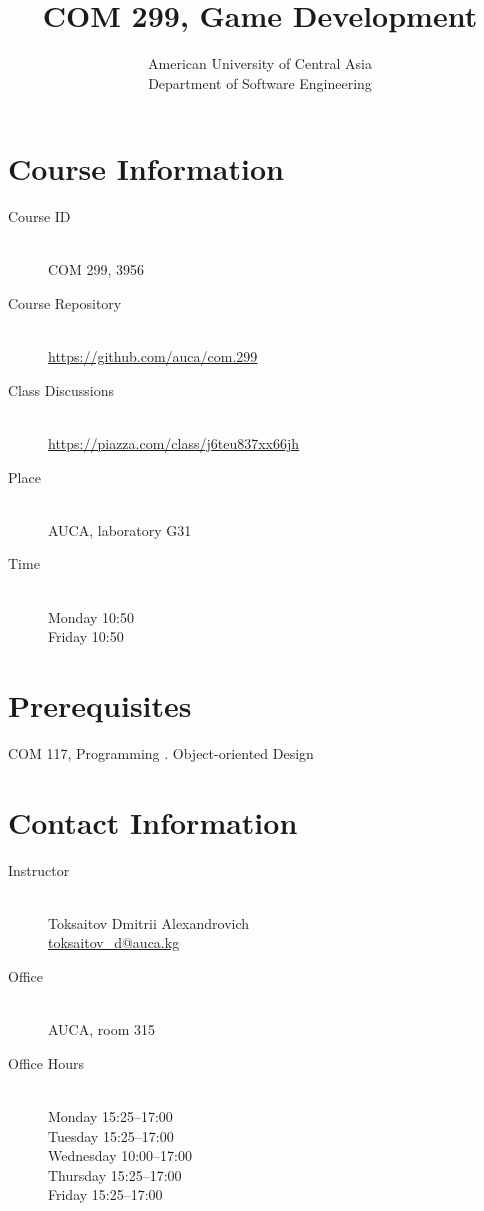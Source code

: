 \documentclass[12pt,a4paper,oneside]{article}
\newcommand{\R}[1]{\uppercase\expandafter{\romannumeral #1\relax}}
\begin{document}
    \title{COM 299, Game Development}
    \author{
        American University of Central Asia\\
        Department of Software Engineering
    }
    \date{}
    \maketitle

    \section{Course Information}

        \begin{description}
            \item[Course ID]\hfill\\
                COM 299, 3956
            \item[Course Repository]\hfill\\
                \url{https://github.com/auca/com.299}
            \item[Class Discussions]\hfill\\
                \url{https://piazza.com/class/j6teu837xx66jh}
            \item[Place]\hfill\\
                AUCA, laboratory G31
            \item[Time]\hfill\\
                Monday 10:50\\
                Friday 10:50
        \end{description}

    \section{Prerequisites}

        COM 117, Programming \R{2}. Object-oriented Design

    \section{Contact Information}

        \begin{description}
            \item[Instructor]\hfill\\
                Toksaitov Dmitrii Alexandrovich\\
                \href{mailto:toksaitov_d@auca.kg}{toksaitov\_d@auca.kg}
            \item[Office]\hfill\\
                AUCA, room 315
            \item[Office Hours]\hfill\\
                Monday 15:25--17:00\\
                Tuesday 15:25--17:00\\
                Wednesday 10:00--17:00\\
                Thursday 15:25--17:00\\
                Friday 15:25--17:00
        \end{description}
\end{document}
